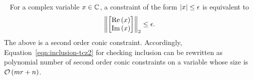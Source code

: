 %
\begin{remark}~\label{rem:socc}
For a complex variable $x\in\mathbb{C}$, a constraint of the form
$\left|x\right|\leq \epsilon$ is equivalent to
%
\[
\left\|\left[\begin{matrix}\operatorname{Re}\left(x\right)\\ \operatorname{Im}\left(x\right)\end{matrix}\right]\right\|_2\leq \epsilon.
\]
The above is a second order conic constraint.  Accordingly,
Equation~\ref{eqn:inclusion-tcz2} for checking inclusion can be
rewritten as polynomial number of second order conic constraints on a
variable whose size is $\mathcal{O}\left(mr+n\right)$.
%
\end{remark}
%
%
